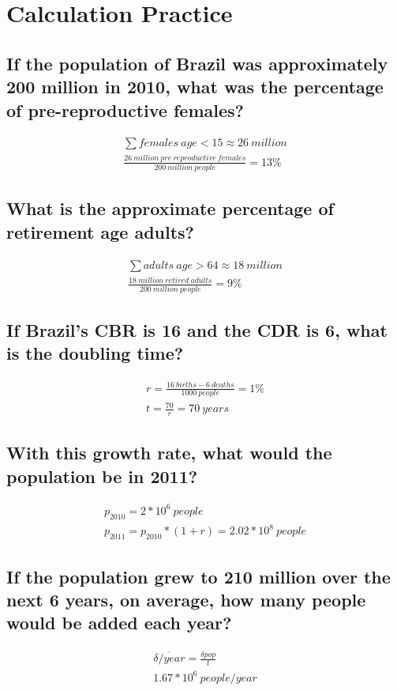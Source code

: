 \documentclass{article}
\begin{document}
\section{Calculation Practice}

\subsection{If the population of Brazil was approximately 200 million in 2010, what was the percentage of pre-reproductive females?}

\begin{gather}
    \sum females\ age<15 \approx 26\ million \\
    \frac{26\ million\ pre\ reproductive\ females}{200\ million\ people} = 13\%
\end{gather}

\subsection{What is the approximate percentage of retirement age adults?}

\begin{gather}
    \sum adults\ age>64 \approx 18\ million \\
    \frac{18\ million\ retired\ adults}{200\ million\ people} = 9\%
\end{gather}

\subsection{If Brazil’s CBR is 16 and the CDR is 6, what is the doubling time?}

\begin{gather}
    r = \frac{16\ births - 6\ deaths}{1000\ people} = 1\% \\
    t = \frac{70}{r} = 70\ years
\end{gather}

\subsection{With this growth rate, what would the population be in 2011?}

\begin{gather}
    p_{2010} = 2 * 10^6\ people \\
    p_{2011} = p_{2010} * (1 + r) = 2.02 * 10^8\ people
\end{gather}

\subsection{If the population grew to 210 million over the next 6 years, on average, how many people would be added each year? }

\begin{gather}
    \overline{\delta /year} = \frac{\delta pop}{t} \\
    1.67 * 10^6\ people/year
\end{gather}
\end{document}
